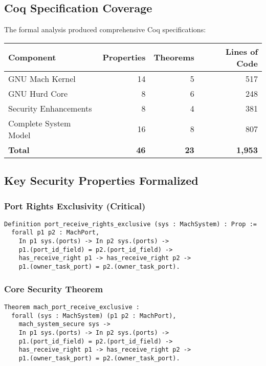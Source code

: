 \documentclass[11pt,a4paper]{article}
\begin{document}
\subsection{Coq Specification Coverage}

The formal analysis produced comprehensive Coq specifications:

\begin{center}
\begin{tabular}{|l|r|r|r|}
\hline
\textbf{Component} & \textbf{Properties} & \textbf{Theorems} & \textbf{Lines of Code} \\
\hline
GNU Mach Kernel & 14 & 5 & 517 \\
GNU Hurd Core & 8 & 6 & 248 \\
Security Enhancements & 8 & 4 & 381 \\
Complete System Model & 16 & 8 & 807 \\
\hline
\textbf{Total} & \textbf{46} & \textbf{23} & \textbf{1,953} \\
\hline
\end{tabular}
\end{center}

\subsection{Key Security Properties Formalized}

\subsubsection{Port Rights Exclusivity (Critical)}

\begin{lstlisting}[style=coqstyle, caption=Port Rights Exclusivity Property]
Definition port_receive_rights_exclusive (sys : MachSystem) : Prop :=
  forall p1 p2 : MachPort,
    In p1 sys.(ports) -> In p2 sys.(ports) ->
    p1.(port_id_field) = p2.(port_id_field) ->
    has_receive_right p1 -> has_receive_right p2 ->
    p1.(owner_task_port) = p2.(owner_task_port).
\end{lstlisting}

\subsubsection{Core Security Theorem}

\begin{lstlisting}[style=coqstyle, caption=Mach Port Receive Exclusivity Theorem]
Theorem mach_port_receive_exclusive : 
  forall (sys : MachSystem) (p1 p2 : MachPort),
    mach_system_secure sys ->
    In p1 sys.(ports) -> In p2 sys.(ports) ->
    p1.(port_id_field) = p2.(port_id_field) ->
    has_receive_right p1 -> has_receive_right p2 ->
    p1.(owner_task_port) = p2.(owner_task_port).
\end{lstlisting}
\end{document}
